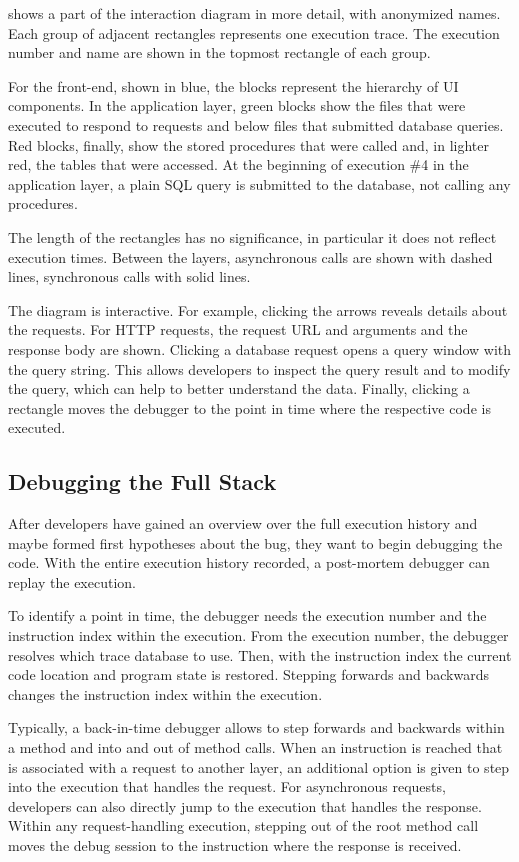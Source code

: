  shows a part of the interaction diagram in more detail, with anonymized names.
Each group of adjacent rectangles represents one execution trace.
The execution number and name are shown in the topmost rectangle of each group.

For the front-end, shown in blue, the blocks represent the hierarchy of UI components.
In the application layer, green blocks show the files that were executed to respond to requests and below files that submitted database queries.
Red blocks, finally, show the stored procedures that were called and, in lighter red, the tables that were accessed.
At the beginning of execution \#4 in the application layer, a plain SQL query is submitted to the database, not calling any procedures.

The length of the rectangles has no significance, in particular it does not reflect execution times.
Between the layers, asynchronous calls are shown with dashed lines, synchronous calls with solid lines.

The diagram is interactive.
For example, clicking the arrows reveals details about the requests.
For HTTP requests, the request URL and arguments and the response body are shown.
Clicking a database request opens a query window with the query string.
This allows developers to inspect the query result and to modify the query, which can help to better understand the data.
Finally, clicking a rectangle moves the debugger to the point in time where the respective code is executed.

\subsection{Debugging the Full Stack}

After developers have gained an overview over the full execution history and maybe formed first hypotheses about the bug, they want to begin debugging the code.
With the entire execution history recorded, a post-mortem debugger can replay the execution.

To identify a point in time, the debugger needs the execution number and the instruction index within the execution.
From the execution number, the debugger resolves which trace database to use.
Then, with the instruction index the current code location and program state is restored.
Stepping forwards and backwards changes the instruction index within the execution.

Typically, a back-in-time debugger allows to step forwards and backwards within a method and into and out of method calls.
When an instruction is reached that is associated with a request to another layer, 
an additional option is given to step into the execution that handles the request.
For asynchronous requests, developers can also directly jump to the execution that handles the response.
Within any request-handling execution, stepping out of the root method call moves the debug session to the instruction where the response is received.

